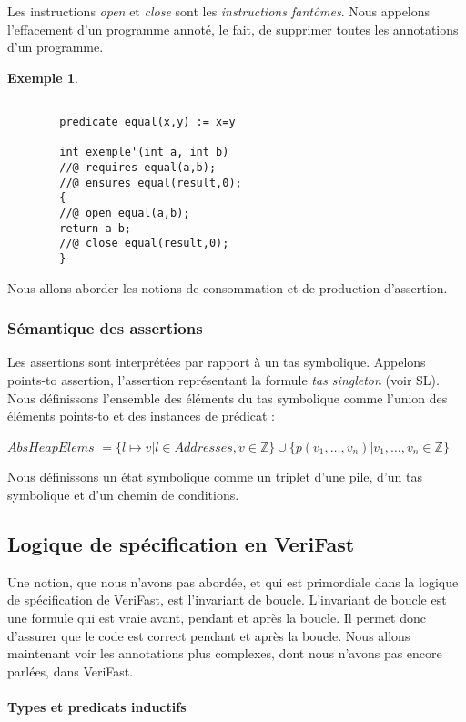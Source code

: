 \documentclass[11pt,openany]{article}
\newcommand{\verifast}{VeriFast}
\newtheorem{exemple}{Exemple}
\begin{document}
	Les instructions \textit{open} et \textit{close} sont les \textit{instructions fant\^omes}. Nous appelons l'effacement d'un programme annot\'e, le fait, de supprimer toutes les annotations d'un programme.
	\begin{exemple}
		\begin{lstlisting}
		
		predicate equal(x,y) := x=y
		
		int exemple'(int a, int b)
		//@ requires equal(a,b);
		//@ ensures equal(result,0);
		{
		//@ open equal(a,b);
		return a-b;
		//@ close equal(result,0);
		}
		\end{lstlisting}
	\end{exemple}
	Nous allons aborder les notions de consommation et de production d'assertion. 
		\subsubsection{S\'emantique des assertions}
	Les assertions sont interpr\'et\'ees par rapport \`a un tas symbolique.
	Appelons points-to assertion, l'assertion repr\'esentant la formule \textit{tas singleton} (voir SL). Nous d\'efinissons l'ensemble des \'el\'ements du tas symbolique comme l'union des \'el\'ements points-to et des instances de pr\'edicat :
	
	$AbsHeapElems$ $= \{l\mapsto v| l\in Addresses, v\in \mathbb{Z}\}\cup\{p(v_1,\ldots, v_n)|v_1,\ldots,v_n\in\mathbb{Z}\}$
	
	Nous d\'efinissons un \'etat symbolique comme un triplet d'une pile, d'un tas symbolique et d'un chemin de conditions.
			
		
	\subsection{Logique de sp\'ecification en \verifast{}}
	
		Une notion, que nous n'avons pas abord\'ee, et qui est primordiale dans la logique de sp\'ecification de \verifast, est l'invariant de boucle. L'invariant de boucle est une formule qui est vraie avant, pendant et apr\`es la boucle. Il permet donc d'assurer que le code est correct pendant et apr\`es la boucle. Nous allons maintenant voir les annotations plus complexes, dont nous n'avons pas encore parl\'ees, dans \verifast.
			\paragraph{Types et predicats inductifs}
		
\end{document}
